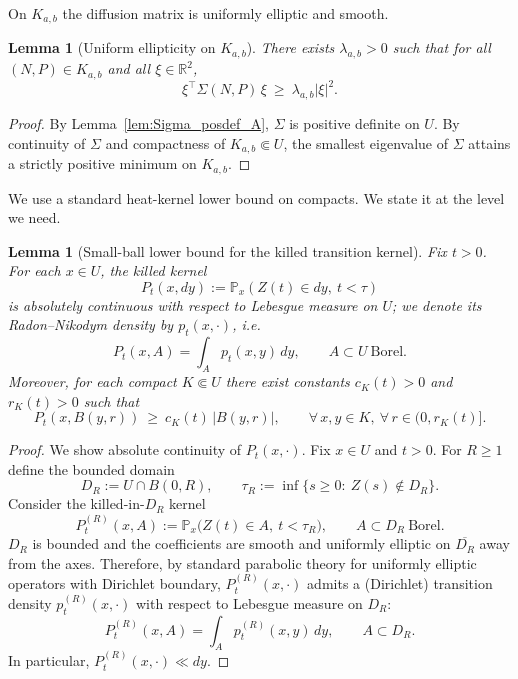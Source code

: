 \documentclass[pdflatex,sn-mathphys-ay]{sn-jnl}
\theoremstyle{thmstyleone}
\newtheorem{lemma}[theorem]{Lemma}
\theoremstyle{definition}
\theoremstyle{remark}
\begin{document}
\begin{appendices}
On $K_{a,b}$ the diffusion matrix is uniformly elliptic and smooth.

\begin{lemma}[Uniform ellipticity on $K_{a,b}$]\label{lem:B_uniform_elliptic}
There exists $\lambda_{a,b}>0$ such that for all $(N,P)\in K_{a,b}$ and all $\xi\in\mathbb R^2$,
\[
\xi^\top \Sigma(N,P)\,\xi \ \ge\ \lambda_{a,b}|\xi|^2.
\]
\end{lemma}

\begin{proof}
By Lemma~\ref{lem:Sigma_posdef_A}, $\Sigma$ is positive definite on $U$. By continuity of $\Sigma$ and compactness of
$K_{a,b}\Subset U$, the smallest eigenvalue of $\Sigma$ attains a strictly positive minimum on $K_{a,b}$.
\end{proof}

We use a standard heat-kernel lower bound on compacts. We state it at the level we need.

\begin{lemma}[Small-ball lower bound for the killed transition kernel]\label{lem:B_Aronson_ball}
Fix $t>0$. For each $x\in U$, the killed kernel
\[
P_t(x,dy):=\mathbb P_x(Z(t)\in dy,\ t<\tau)
\]
is absolutely continuous with respect to Lebesgue measure on $U$; we denote its Radon--Nikodym density by
$p_t(x,\cdot)$, i.e.
\[
P_t(x,A)=\int_A p_t(x,y)\,dy,\qquad A\subset U\ \text{Borel}.
\]
Moreover, for each compact $K\Subset U$ there exist constants $c_K(t)>0$ and $r_K(t)>0$ such that
\begin{equation}\label{eq:B_ball_lower_rewrite}
P_t(x,B(y,r))\ \ge\ c_K(t)\,|B(y,r)|,
\qquad \forall\,x,y\in K,\ \forall\,r\in(0,r_K(t)].
\end{equation}
\end{lemma}

\begin{proof}
We show absolute continuity of $P_t(x,\cdot)$.
Fix $x\in U$ and $t>0$. For $R\ge1$ define the bounded domain
\[
D_R:=U\cap B(0,R),
\qquad
\tau_R:=\inf\{s\ge0:\ Z(s)\notin D_R\}.
\]
Consider the killed-in-$D_R$ kernel
\[
P_t^{(R)}(x,A):=\mathbb P_x\bigl(Z(t)\in A,\ t<\tau_R\bigr),\qquad A\subset D_R\ \text{Borel}.
\]
$D_R$ is bounded and the coefficients are smooth and uniformly elliptic on $\overline{D_R}$ away from the axes. Therefore, by standard parabolic theory for uniformly elliptic operators with Dirichlet boundary, $P_t^{(R)}(x,\cdot)$
admits a (Dirichlet) transition density $p_t^{(R)}(x,\cdot)$ with respect to Lebesgue measure on $D_R$:
\[
P_t^{(R)}(x,A)=\int_{A} p_t^{(R)}(x,y)\,dy,\qquad A\subset D_R.
\]
In particular, $P_t^{(R)}(x,\cdot)\ll dy$.


\end{proof}
\end{appendices}
\end{document}

